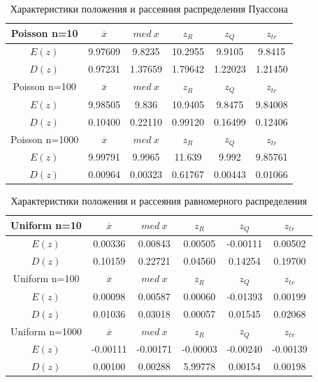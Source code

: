 \begin{table}[H]
	\begin{center}
		\begin{tabular}{|c||c|c|c|c|c|}
			\hline
			Poisson n=10 & $\overline{x} $ & $med\:x$ & $z_{R}$ & $z_{Q}$ & $z_{tr}$ \\
			\hline\hline
			$E(z)$ & 9.97609 &9.8235 & 10.2955 & 9.9105 &  9.8415  \\
			\hline
			$D(z)$ &0.97231  &1.37659 &1.79642 & 1.22023 & 1.21450 \\
			\hline\hline
			Poisson n=100 & $\overline{x} $ & $med\:x$ & $z_{R}$ & $z_{Q}$ & $z_{tr}$ \\
			\hline\hline
			$E(z)$ & 9.98505 & 9.836 & 10.9405  & 9.8475 & 9.84008 \\
			\hline
			$D(z)$ & 0.10400 & 0.22110 & 0.99120  & 0.16499 & 0.12406 \\
			\hline\hline
			Poisson n=1000 & $\overline{x} $ & $med\:x$ & $z_{R}$ & $z_{Q}$ & $z_{tr}$ \\
			\hline\hline
			$E(z)$ & 9.99791 & 9.9965 & 11.639 & 9.992  & 9.85761 \\
			\hline
			$D(z)$ &  0.00964 & 0.00323 & 0.61767 & 0.00443 & 0.01066 \\
			\hline
		\end{tabular}
	\end{center}
	\caption{Характеристики положения и рассеяния распределения Пуассона}
\end{table} 

\begin{table}[H]
	\begin{center}
		\begin{tabular}{|c||c|c|c|c|c|}
			\hline
			Uniform n=10 & $\overline{x} $ & $med\:x$ & $z_{R}$ & $z_{Q}$ & $z_{tr}$ \\
			\hline\hline
			$E(z)$ & 0.00336 &0.00843 & 0.00505 & -0.00111 & 0.00502 \\
			\hline
			$D(z)$ & 0.10159  & 0.22721 & 0.04560 & 0.14254 & 0.19700 \\
			\hline\hline
			Uniform n=100 & $\overline{x} $ & $med\:x$ & $z_{R}$ & $z_{Q}$ & $z_{tr}$ \\
			\hline\hline
			$E(z)$ & 0.00098 & 0.00587 & 0.00060 & -0.01393 &  0.00199\\
			\hline
			$D(z)$ & 0.01036 & 0.03018 & 0.00057 & 0.01545 & 0.02068  \\
			\hline\hline
			Uniform n=1000 & $\overline{x} $ & $med\:x$ & $z_{R}$ & $z_{Q}$ & $z_{tr}$ \\
			\hline\hline
			$E(z)$ & -0.00111 &-0.00171 & -0.00003 & -0.00240 & -0.00139  \\
			\hline
			$D(z)$ & 0.00100 & 0.00288 & 5.99778 & 0.00154 & 0.00198 \\
			\hline
		\end{tabular}
	\end{center}
	\caption{Характеристики положения и рассеяния равномерного распределения}
\end{table} 